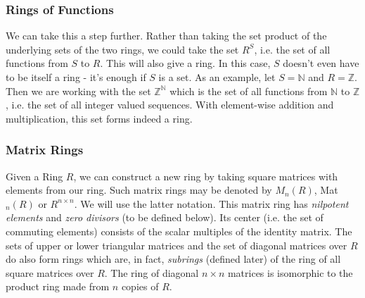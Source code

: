 

\subsubsection{Rings of Functions}
We can take this a step further. Rather than taking the set product of the underlying sets of the two rings, we could take the set $R^S$, i.e. the set of all functions from $S$ to $R$. This will also give a ring. In this case, $S$ doesn't even have to be itself a ring - it's enough if $S$ is a set. As an example, let $S = \mathbb{N}$ and $R = \mathbb{Z}$. Then we are working with the set $\mathbb{Z}^\mathbb{N}$ which is the set of all functions from $\mathbb{N}$ to $\mathbb{Z}$, i.e. the set of all integer valued sequences. With element-wise addition and multiplication, this set forms indeed a ring.






\subsubsection{Matrix Rings}
Given a Ring $R$, we can construct a new ring by taking square matrices with elements from our ring. Such matrix rings may be denoted by $M_n(R)$, Mat$_n(R)$ or $R^{n \times n}$. We will use the latter notation. This matrix ring has \emph{nilpotent elements} and \emph{zero divisors} (to be defined below). Its center (i.e. the set of commuting elements) consists of the scalar multiples of the identity matrix. The sets of upper or lower triangular matrices and the set of diagonal matrices over $R$ do also form rings which are, in fact, \emph{subrings} (defined later) of the ring of all square matrices over $R$. The ring of diagonal $n \times n$ matrices is isomorphic to the product ring made from $n$ copies of $R$.

